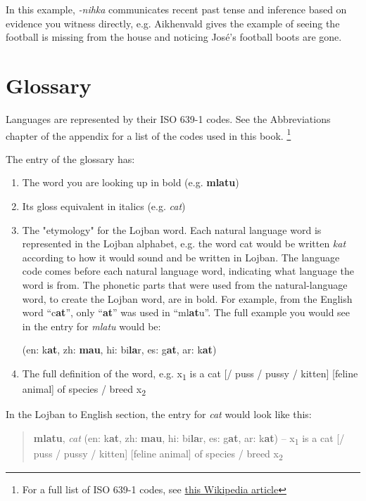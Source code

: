 \documentclass[12pt]{book}
\begin{document}
In this example, \emph{-nihka} communicates recent past tense and inference based on evidence you witness directly, e.g. Aikhenvald gives the example of seeing the football is missing from the house and noticing Jos{\'e}'s football boots are gone.	




\appendix

\chapter{Glossary}

Languages are represented by their ISO 639-1 codes. See the Abbreviations chapter of the appendix for a list of the codes used in this book. \footnote{For a full list of ISO 639-1 codes, see \href{https://en.wikipedia.org/wiki/List_of_ISO_639-1_codes}{this Wikipedia article}}

The entry of the glossary has:

\begin{enumerate}
\item The word you are looking up in bold (e.g. \textbf{mlatu})
\item Its gloss equivalent in italics (e.g. \textit{cat}) 
\item The "etymology" for the Lojban word. Each natural language word is represented in the Lojban alphabet, e.g. the word cat would be written \emph{kat} according to how it would sound and be written in Lojban. The language code comes before each natural language word, indicating what language the word is from. The phonetic parts that were used from the natural-language word, to create the Lojban word, are in bold. For example, from the English word ``c\textbf{at}'', only ``\textbf{at}'' was used in ``ml\textbf{at}u''. The full example you would see in the entry for \emph{mlatu} would be: 

(en: k\textbf{at}, zh: \textbf{mau}, hi: bi\textbf{la}r, es: g\textbf{at}, ar: k\textbf{at})
\item The full definition of the word, e.g. x\textsubscript{1} is a cat [/ puss / pussy / kitten] [feline animal] of species / breed x\textsubscript{2}
\end{enumerate}


In the Lojban to English section, the entry for \emph{cat} would look like this:


\begin{quote}
\textbf{mlatu}, \textit{cat} (en: k\textbf{at}, zh: \textbf{mau}, hi: bi\textbf{la}r, es: g\textbf{at}, ar: k\textbf{at}) -- x\textsubscript{1} is a cat [/ puss / pussy / kitten] [feline animal] of species / breed x\textsubscript{2}
\end{quote}
\end{document}

